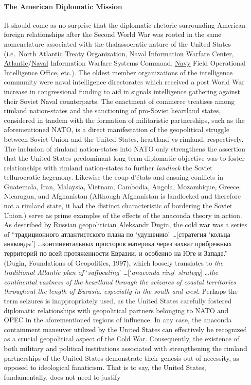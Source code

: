 \documentclass[12pt]{article}
\begin{document}
\paragraph{The American Diplomatic Mission} It should come as no surprise that the diplomatic rhetoric surrounding American foreign relationships after the Second World War was rooted in the same nomenclature associated with the thalassocratic nature of the United States (i.e.\ North \underline{Atlantic} Treaty Organization, \underline{Naval} Information Warfare Center, \underline{Atlantic}/\underline{Naval} Information Warfare Systems Command, \underline{Navy} Field Operational Intelligence Office, etc.). The oldest member organizations of the intelligence community were naval intelligence directorates which received a post World War increase in congressional funding to aid in signals intelligence gathering against their Soviet Naval counterparts. The enactment of commerce treatises among rimland nation-states and the sanctioning of pro-Soviet heartland states, considered in tandem with the formation of militaristic partnerships, such as the aforementioned NATO, is a direct manifestation of the geopolitical struggle between Soviet Union and the United States, heartland vs rimland, respectively. The inclusion of rimland nation-states into NATO only strengthens the assertion that the United States predominant long term diplomatic objective was to foster relationships with rimland nation-states to further \emph{landlock} the Soviet tellurocratic hegemony. Likewise the coup d'\'etats and ensuing conflicts in Guatemala, Iran, Malaysia, Vietnam, Cambodia, Angola, Mozambique, Greece, Nicaragua, and Afghanistan (Although Afghanistan is landlocked and therefore not a rimland state, it had the distinct characteristic of bordering the Soviet Union.) serve as prime examples of the effects of the anaconda theory in action. As described by Russian geopolitician Aleksandr Dugin, the cold war was a series of “традиционного атлантистского плана по `удушению'  \dots [стратегия `кольца анаконды'] \dots континентальных просторов материка через захват прибрежных территорий по всей протяженности Евразии, и особенно на Юге и Западе.” (Dugin, Foundations of Geopolitics, 1997), which loosely translates to \emph{the traditional Atlantic plan of} `\emph{suffocating}' \dots [`\emph{anaconda ring}' \emph{strategy}] \dots \emph{the continental vastness of the heartland through the seizures of coastal territories throughout the length of Eurasia}, \emph{especially in the south and west}. Perhaps the term seizures is inappropriately used, as the United States carefully fostered diplomatic relationships with geopolitical partners belonging to NATO and OPEC in the aforementioned regions of influence. In any case, the anaconda containment maneuver utilized by the United States can effectively be recognized as a crucial geopolitical aspect of the Cold War. Consequently, the existence of both military and political institutions associated with strengthening the rimland partnerships of the United States demonstrate their genesis out of necessity, as opposed to ideological fanaticism. That is to say, the United States, fundamentally, does not need to justify 
\end{document}
